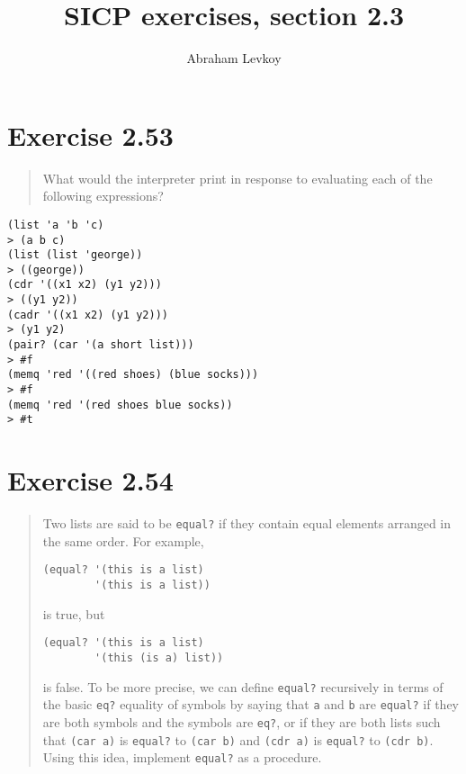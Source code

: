 \documentclass{article}
\author{Abraham Levkoy}
\title{SICP exercises, section 2.3}
\begin{document}
\maketitle

\section{Exercise 2.53}
\begin{quote}
    What would the interpreter print in response to evaluating each of the
    following expressions?
\end{quote}

\begin{lstlisting}
(list 'a 'b 'c)
> (a b c)
(list (list 'george))
> ((george))
(cdr '((x1 x2) (y1 y2)))
> ((y1 y2))
(cadr '((x1 x2) (y1 y2)))
> (y1 y2)
(pair? (car '(a short list)))
> #f
(memq 'red '((red shoes) (blue socks)))
> #f
(memq 'red '(red shoes blue socks))
> #t
\end{lstlisting}

\section{Exercise 2.54}
\begin{quote}
    Two lists are said to be \texttt{equal?} if they contain equal elements
    arranged in the same order. For example,

    \begin{lstlisting}
(equal? '(this is a list)
        '(this is a list))
    \end{lstlisting}

is true, but

    \begin{lstlisting}
(equal? '(this is a list)
        '(this (is a) list))
    \end{lstlisting}

    is false. To be more precise, we can define \texttt{equal?} recursively in
    terms of the basic \texttt{eq?} equality of symbols by saying that
    \texttt{a} and \texttt{b} are \texttt{equal?} if they are both symbols and
    the symbols are \texttt{eq?}, or if they are both lists such that
    \texttt{(car a)} is \texttt{equal?} to \texttt{(car b)} and \texttt{(cdr
    a)} is \texttt{equal?} to \texttt{(cdr b)}. Using this idea, implement
    \texttt{equal?} as a procedure.
\end{quote}


\end{document}
